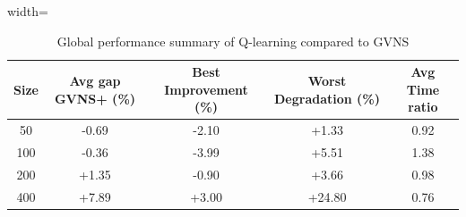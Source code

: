 \begin{table}[ht]
\centering
\footnotesize
\setlength{\tabcolsep}{4pt}
\caption{Global performance summary of Q-learning compared to GVNS}
\vspace{3mm}
\begin{adjustbox}{width=\textwidth}
\begin{tabular}{c c c c c}
\toprule
\textbf{Size} & \textbf{Avg gap GVNS+ (\%)} & \textbf{Best Improvement (\%)} & \textbf{Worst Degradation (\%)} & \textbf{Avg Time ratio} \\
\midrule
50  & -0.69 & -2.10 & +1.33  & 0.92 \\
100 & -0.36 & -3.99 & +5.51  & 1.38 \\
200 & +1.35 & -0.90 & +3.66  & 0.98 \\
400 & +7.89 & +3.00 & +24.80 & 0.76 \\
\bottomrule
\end{tabular}
\end{adjustbox}
\label{tab:qlearning_summary}
\end{table}